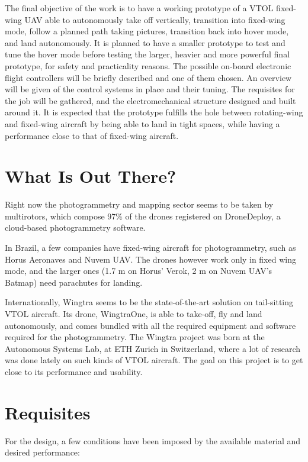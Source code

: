 %
The final objective of the work is to have a working prototype of a VTOL fixed-wing UAV able to autonomously take off vertically, transition into fixed-wing mode, follow a planned path taking pictures, transition back into hover mode, and land autonomously.
%
It is planned to have a smaller prototype to test and tune the hover mode before testing the larger, heavier and more powerful final prototype, for safety and practicality reasons.
%
The possible on-board electronic flight controllers will be briefly described and one of them chosen.
%
An overview will be given of the control systems in place and their tuning.
%
The requisites for the job will be gathered, and the electromechanical structure designed and built around it.
%
It is expected that the prototype fulfills the hole between rotating-wing and fixed-wing aircraft by being able to land in tight spaces, while having a performance close to that of fixed-wing aircraft.

\section{What Is Out There?}
Right now the photogrammetry and mapping sector seems to be taken by multirotors, which compose 97\% of the drones registered on DroneDeploy\cite{dronedeployreport}, a cloud-based photogrammetry software. 

In Brazil, a few companies have fixed-wing aircraft for photogrammetry, such as Horus Aeronaves and Nuvem UAV. The drones however work only in fixed wing mode, and the larger ones (1.7 m on Horus' Verok, 2 m on Nuvem UAV's Batmap) need parachutes for landing. 

Internationally, Wingtra seems to be the state-of-the-art solution on tail-sitting VTOL aircraft. Its drone, WingtraOne, is able to take-off, fly and land autonomously, and comes bundled with all the required equipment and software required for the photogrammetry. The Wingtra project was born at the  Autonomous Systems Lab, at ETH Zurich in Switzerland, where a lot of research was done lately on such kinds of VTOL aircraft\cite{autonomoussystemslab}. The goal on this project is to get close to its performance and usability.
\section{Requisites}

For the design, a few conditions have been imposed by the available material and desired performance:

